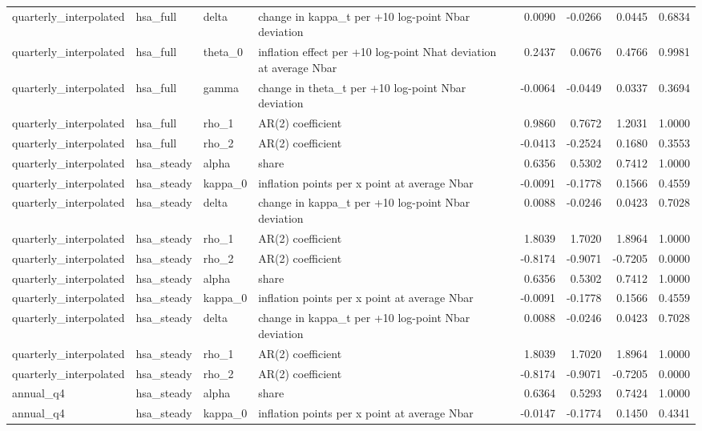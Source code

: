 \begin{tabular}{llllrrrr}
quarterly\_interpolated & hsa\_full & delta & change in kappa\_t per +10 log-point Nbar deviation & 0.0090 & -0.0266 & 0.0445 & 0.6834 \\
quarterly\_interpolated & hsa\_full & theta\_0 & inflation effect per +10 log-point Nhat deviation at average Nbar & 0.2437 & 0.0676 & 0.4766 & 0.9981 \\
quarterly\_interpolated & hsa\_full & gamma & change in theta\_t per +10 log-point Nbar deviation & -0.0064 & -0.0449 & 0.0337 & 0.3694 \\
quarterly\_interpolated & hsa\_full & rho\_1 & AR(2) coefficient & 0.9860 & 0.7672 & 1.2031 & 1.0000 \\
quarterly\_interpolated & hsa\_full & rho\_2 & AR(2) coefficient & -0.0413 & -0.2524 & 0.1680 & 0.3553 \\
quarterly\_interpolated & hsa\_steady & alpha & share & 0.6356 & 0.5302 & 0.7412 & 1.0000 \\
quarterly\_interpolated & hsa\_steady & kappa\_0 & inflation points per x point at average Nbar & -0.0091 & -0.1778 & 0.1566 & 0.4559 \\
quarterly\_interpolated & hsa\_steady & delta & change in kappa\_t per +10 log-point Nbar deviation & 0.0088 & -0.0246 & 0.0423 & 0.7028 \\
quarterly\_interpolated & hsa\_steady & rho\_1 & AR(2) coefficient & 1.8039 & 1.7020 & 1.8964 & 1.0000 \\
quarterly\_interpolated & hsa\_steady & rho\_2 & AR(2) coefficient & -0.8174 & -0.9071 & -0.7205 & 0.0000 \\
quarterly\_interpolated & hsa\_steady & alpha & share & 0.6356 & 0.5302 & 0.7412 & 1.0000 \\
quarterly\_interpolated & hsa\_steady & kappa\_0 & inflation points per x point at average Nbar & -0.0091 & -0.1778 & 0.1566 & 0.4559 \\
quarterly\_interpolated & hsa\_steady & delta & change in kappa\_t per +10 log-point Nbar deviation & 0.0088 & -0.0246 & 0.0423 & 0.7028 \\
quarterly\_interpolated & hsa\_steady & rho\_1 & AR(2) coefficient & 1.8039 & 1.7020 & 1.8964 & 1.0000 \\
quarterly\_interpolated & hsa\_steady & rho\_2 & AR(2) coefficient & -0.8174 & -0.9071 & -0.7205 & 0.0000 \\
annual\_q4 & hsa\_steady & alpha & share & 0.6364 & 0.5293 & 0.7424 & 1.0000 \\
annual\_q4 & hsa\_steady & kappa\_0 & inflation points per x point at average Nbar & -0.0147 & -0.1774 & 0.1450 & 0.4341 \\

\end{tabular}
